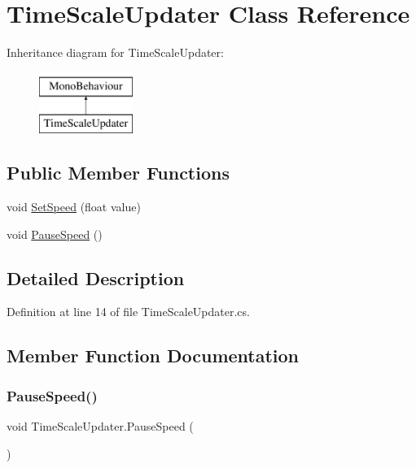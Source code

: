 \hypertarget{class_time_scale_updater}{}\section{Time\+Scale\+Updater Class Reference}
\label{class_time_scale_updater}
Inheritance diagram for Time\+Scale\+Updater\+:\begin{figure}[H]
\begin{center}
\leavevmode
\includegraphics[height=2.000000cm]{class_time_scale_updater}
\end{center}
\end{figure}
\subsection*{Public Member Functions}
\begin{DoxyCompactItemize}
\item 
void \hyperlink{class_time_scale_updater_a83538223f680a9196f9c0a27424e24ae}{Set\+Speed} (float value)
\item 
void \hyperlink{class_time_scale_updater_ac3c3319612df3f3cc9cf87daaf0681cd}{Pause\+Speed} ()
\end{DoxyCompactItemize}


\subsection{Detailed Description}


Definition at line 14 of file Time\+Scale\+Updater.\+cs.



\subsection{Member Function Documentation}
\mbox{\label{class_time_scale_updater_ac3c3319612df3f3cc9cf87daaf0681cd}} 
\subsubsection{\texorpdfstring{Pause\+Speed()}{PauseSpeed()}}
{\footnotesize\ttfamily void Time\+Scale\+Updater.\+Pause\+Speed (\begin{DoxyParamCaption}{ }\end{DoxyParamCaption})}



